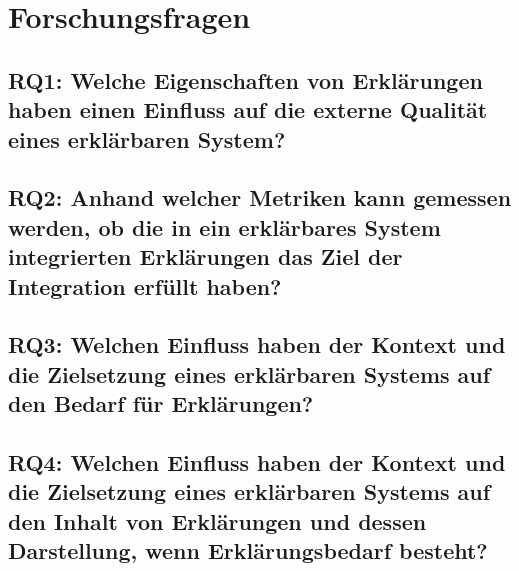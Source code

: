 \section{Forschungsfragen}

\subsection{RQ1: Welche Eigenschaften von Erklärungen haben einen Einfluss auf die externe Qualität eines erklärbaren System?}

\subsection{RQ2: Anhand welcher Metriken kann gemessen werden, ob die in ein erklärbares System integrierten Erklärungen das Ziel der Integration erfüllt haben?}

\subsection{RQ3: Welchen Einfluss haben der Kontext und die Zielsetzung eines erklärbaren Systems auf den Bedarf für Erklärungen?}

\subsection{RQ4: Welchen Einfluss haben der Kontext und die Zielsetzung eines erklärbaren Systems auf den Inhalt von Erklärungen und dessen Darstellung, wenn Erklärungsbedarf besteht?}
